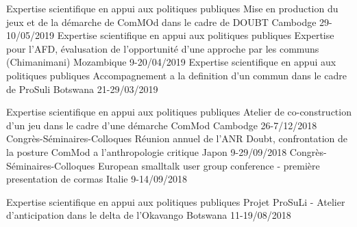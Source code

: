 \begin{cvhonors}
    \cvhonor
      {Expertise scientifique en appui aux politiques publiques} %
      {Mise en production du jeux et de la démarche de ComMOd dans le cadre de DOUBT} %
      {Cambodge} %
      {29-10/05/2019} %
    \cvhonor
      {Expertise scientifique en appui aux politiques publiques} %
      {Expertise pour l'AFD, évalusation de l'opportunité d'une approche par les communs (Chimanimani)} %
      {Mozambique} %
      {9-20/04/2019} %
    \cvhonor
      {Expertise scientifique en appui aux politiques publiques} %
      {Accompagnement a la definition d'un commun dans le cadre de ProSuli} %
      {Botswana} %
      {21-29/03/2019} %

    \cvhonor
      {Expertise scientifique en appui aux politiques publiques} %
      {Atelier de co-construction d'un jeu dans le cadre d'une démarche ComMod} %
      {Cambodge} %
      {26-7/12/2018} %
    \cvhonor
      {Congrès-Séminaires-Colloques} %
      {Réunion annuel de l'ANR Doubt, confrontation de la posture ComMod a l'anthropologie critique} %
      {Japon} %
      {9-29/09/2018} %
    \cvhonor
      {Congrès-Séminaires-Colloques} %
      {European smalltalk user group conference - première presentation de cormas} %
      {Italie} %
      {9-14/09/2018} %

    \cvhonor
      {Expertise scientifique en appui aux politiques publiques} %
      {Projet ProSuLi - Atelier d'anticipation dans le delta de l'Okavango} %
      {Botswana} %
      {11-19/08/2018} %





\end{cvhonors}

